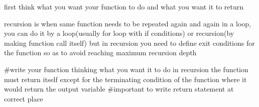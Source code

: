 first think what you want your function to do and what you want it to return 

recursion is when same function needs to be repeated again and again in a loop, you can do it by a loop(usually for loop with if conditions) or recursion(by making function call itself) but in recursion you need to define exit conditions for the function so as to avoid reaching  maximum recursion depth 

#write your function thinking what you want it to do
in recursion the function must return itself except for the terminating condition of the function where it would return the output variable
#important to write return statement at correct place

